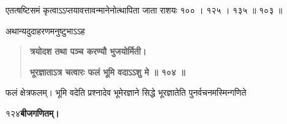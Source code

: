 \documentclass[11pt, openany]{book}
\begin{document}
\begin{sloppypar}
\hangindent=0.2in एतत्षष्टिसमं कृत्वाऽऽप्तयावत्तावन्मानेनोत्थापिता जाता राशयः १०० । १२५ । १३५ ॥ १०३ ॥

\hangindent=0.2in \hspace{0.2in}अथान्यदुदाहरणमनुष्टुभाऽऽह\textendash

\begin{quote}
\hspace{1in}\textbf{त्रयोदश तथा पञ्च करण्यौ भुजयोर्मिती।}

\hspace{1in}\textbf{भूरज्ञाताऽत्र चत्वारः फलं भूमि वदाऽऽशु मे ॥ १०४ ॥}
\end{quote}

\hangindent=0.2in \hspace{0.2in}फलं क्षेत्रफलम्। भूमि वदेति प्रश्नादेव भूमेरज्ञाने सिद्धे भूरज्ञातेति पुनर्वचनमस्मिन्गणिते
\end{sloppypar}
\thispagestyle{empty}
\newpage

\onehalfspacing
१२४\hspace{2in}\textbf{बीजगणितम्।} 

\vspace{5mm}
\end{document}

